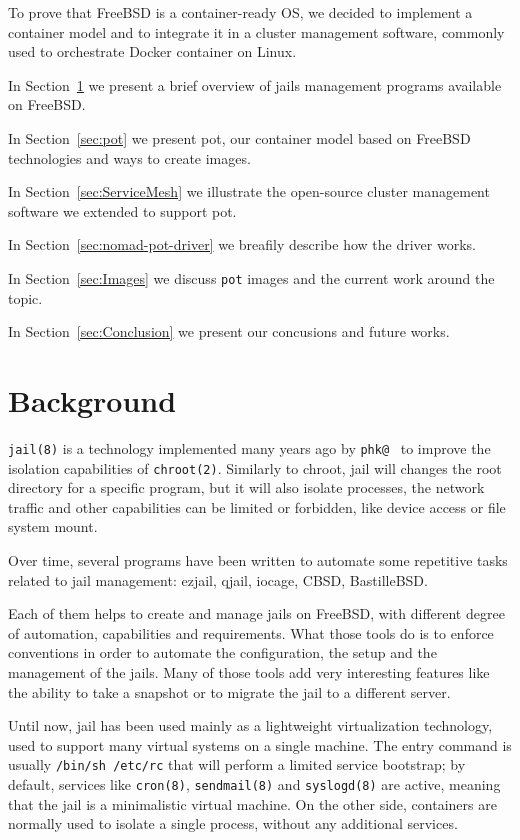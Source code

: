 \documentclass[conference,a4paper,11pt]{IEEEtran}
\begin{document}
To prove that FreeBSD is a container-ready OS, we decided to implement a container model and to integrate it in a cluster management software, commonly used to orchestrate Docker container on Linux.

In Section~\ref{sec:Background}  we present a brief overview of jails management programs available on FreeBSD.\@

In Section~\ref{sec:pot} we present pot, our container model based on FreeBSD technologies and ways to create images.

In Section~\ref{sec:ServiceMesh} we illustrate the open-source cluster management software we extended to support pot.

In Section~\ref{sec:nomad-pot-driver} we breafily describe how the driver works.

In Section~\ref{sec:Images} we discuss \texttt{pot} images and the current work around the topic.

In Section~\ref{sec:Conclusion}  we present our concusions and future works.
 
\section{Background}\label{sec:Background}
\texttt{jail(8)} is a technology implemented many years ago by \texttt{phk@}~\cite{jail} to improve the isolation capabilities of \texttt{chroot(2)}. Similarly to chroot, jail will changes the root directory for a specific program, but it will also isolate processes, the network traffic and other capabilities can be limited or forbidden, like device access or file system mount.

Over time, several programs have been written to automate some repetitive tasks related to jail management: ezjail, qjail, iocage, CBSD, BastilleBSD.\@

Each of them helps to create and manage jails on FreeBSD, with different degree of automation, capabilities and requirements. What those tools do is to enforce conventions in order to automate the configuration, the setup  and the management of the jails. Many of those tools add very interesting features like the ability to take a snapshot or to migrate the jail to a different server.

Until now, jail has been used mainly as a lightweight virtualization technology, used to support many virtual systems on a single machine. The entry command is usually \texttt{/bin/sh /etc/rc} that will perform a limited service bootstrap; by default, services like \texttt{cron(8)}, \texttt{sendmail(8)} and \texttt{syslogd(8)} are active, meaning that the jail is a minimalistic virtual machine. On the other side, containers are normally used to isolate a single process, without any additional services.
\end{document}

